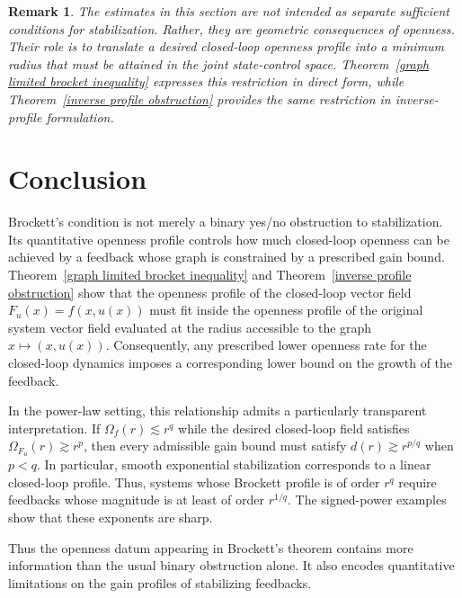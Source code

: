 \documentclass[pdflatex,sn-mathphys-num]{sn-jnl}%
\theoremstyle{thmstyleone}%
\theoremstyle{thmstyletwo}%
\newtheorem{remark}{Remark}%
\theoremstyle{thmstylethree}%
\begin{document}

    \begin{remark}
        The estimates in this section are not intended as separate sufficient conditions for stabilization.  Rather, they are geometric consequences of openness.  Their role is to translate a desired closed-loop openness profile into a minimum radius that must be attained in the joint state-control space.  Theorem~\ref{graph limited brocket inequality} expresses this restriction in direct form, while Theorem~\ref{inverse profile obstruction} provides the same restriction in inverse-profile formulation.
    \end{remark}



\section{Conclusion}


    Brockett's condition is not merely a binary yes/no obstruction to stabilization. Its quantitative openness profile controls how much closed-loop openness can be achieved by a feedback whose graph is constrained by a prescribed gain bound.  Theorem~\ref{graph limited brocket inequality} and Theorem~\ref{inverse profile obstruction} show that the openness profile of the closed-loop vector field $F_u(x)=f(x,u(x))$ must fit inside the openness profile of the original system vector field evaluated at the radius accessible to the graph $x\mapsto (x,u(x))$.  Consequently, any prescribed lower openness rate for the closed-loop dynamics imposes a corresponding lower bound on the growth of the feedback.

    In the power-law setting, this relationship admits a particularly transparent interpretation.  If $\Omega_f(r)\lesssim r^q$ while the desired closed-loop field satisfies $\Omega_{F_u}(r)\gtrsim r^p$, then every admissible gain bound must satisfy $d(r)\gtrsim r^{p/q}$ when $p<q$.  In particular, smooth exponential stabilization corresponds to a linear closed-loop profile. Thus, systems whose Brockett profile is of order $r^q$ require feedbacks whose magnitude is at least of order $r^{1/q}$.  The signed-power examples show that these exponents are sharp.

    Thus the openness datum appearing in Brockett's theorem contains more information than the usual binary obstruction alone.  It also encodes quantitative limitations on the gain profiles of stabilizing feedbacks.
    
\end{document}
